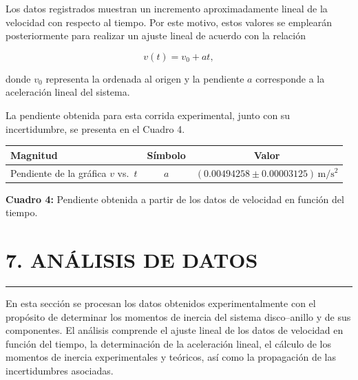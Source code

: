 \documentclass[11pt,a4paper]{article}
\newcommand{\sectionline}{%
    \vspace{-0.6em}
    \noindent\rule{\textwidth}{0.5pt}
    \vspace{0.5em}
}
\begin{document}
Los datos registrados muestran un incremento aproximadamente lineal de
la velocidad con respecto al tiempo. Por este motivo, estos valores se
emplearán posteriormente para realizar un ajuste lineal de acuerdo con
la relación

\[
v(t)=v_0+at,
\]

donde \(v_0\) representa la ordenada al origen y la pendiente \(a\)
corresponde a la aceleración lineal del sistema.

La pendiente obtenida para esta corrida experimental, junto con su
incertidumbre, se presenta en el Cuadro 4.

\begin{table}[h!]
\centering
\renewcommand{\arraystretch}{1.25}

\begin{tabular}{lcc}
\hline
\textbf{Magnitud} & \textbf{Símbolo} & \textbf{Valor} \\
\hline
Pendiente de la gráfica \(v\) vs.\ \(t\)
& \(a\)
& \((0.00494258 \pm 0.00003125)\,\mathrm{m/s^2}\) \\
\hline
\end{tabular}

\vspace{0.2cm}

\textbf{Cuadro 4:} Pendiente obtenida a partir de los datos de velocidad
en función del tiempo.

\end{table}


\newpage

\section*{7. ANÁLISIS DE DATOS}
\sectionline

En esta sección se procesan los datos obtenidos experimentalmente con el
propósito de determinar los momentos de inercia del sistema disco--anillo
y de sus componentes. El análisis comprende el ajuste lineal de los datos
de velocidad en función del tiempo, la determinación de la aceleración
lineal, el cálculo de los momentos de inercia experimentales y teóricos,
así como la propagación de las incertidumbres asociadas.


\end{document}
